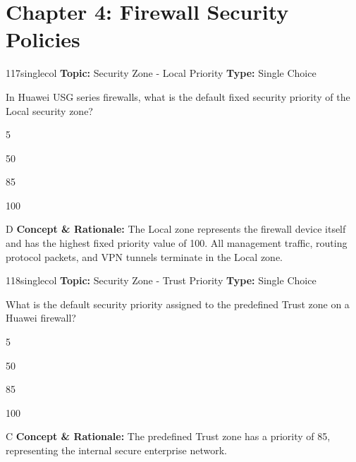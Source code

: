 \section{Chapter 4: Firewall Security Policies}

\begin{qcard}{117}{singlecol}
\textcolor{darkslate!75}{\small\textbf{Topic:} Security Zone - Local Priority \hfill \textbf{Type:} Single Choice}\vspace{0.4em}\par
In Huawei USG series firewalls, what is the default fixed security priority of the Local security zone?
\begin{qoptions}
\item 5
\item 50
\item 85
\item 100
\end{qoptions}
\end{qcard}
\nopagebreak
\begin{explainbox}{D}
\textbf{Concept \& Rationale:} The Local zone represents the firewall device itself and has the highest fixed priority value of 100. All management traffic, routing protocol packets, and VPN tunnels terminate in the Local zone.
\end{explainbox}

\begin{qcard}{118}{singlecol}
\textcolor{darkslate!75}{\small\textbf{Topic:} Security Zone - Trust Priority \hfill \textbf{Type:} Single Choice}\vspace{0.4em}\par
What is the default security priority assigned to the predefined Trust zone on a Huawei firewall?
\begin{qoptions}
\item 5
\item 50
\item 85
\item 100
\end{qoptions}
\end{qcard}
\nopagebreak
\begin{explainbox}{C}
\textbf{Concept \& Rationale:} The predefined Trust zone has a priority of 85, representing the internal secure enterprise network.
\end{explainbox}

